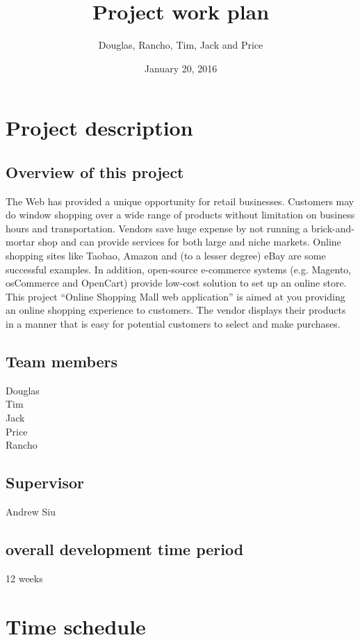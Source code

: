 \documentclass{article}
\title{Project work plan}
\date{January 20, 2016}
\author{Douglas, Rancho, Tim, Jack and Price}
\begin{document}
\maketitle
\section{ Project description}

\subsection{Overview of this project}

The Web has provided a unique opportunity for retail businesses. Customers may do window shopping over a wide range of products without limitation on business hours and transportation. Vendors save huge expense by not running a brick-and-mortar shop and can provide services for both large and niche markets. Online shopping sites like Taobao, Amazon and (to a lesser degree) eBay are some successful examples. In addition, open-source e-commerce systems (e.g. Magento, osCommerce and OpenCart) provide low-cost solution to set up an online store.
\\ This project “Online Shopping Mall web application” is aimed at you providing an online shopping experience to customers. The vendor displays their products in a manner that is easy for potential customers to select and make purchases.

\subsection{Team members}

Douglas
\\ Tim
\\ Jack
\\ Price
\\ Rancho

\subsection{Supervisor}
Andrew Siu

\subsection{overall development time period}
12 weeks

\section{Time schedule}
\end{document}
